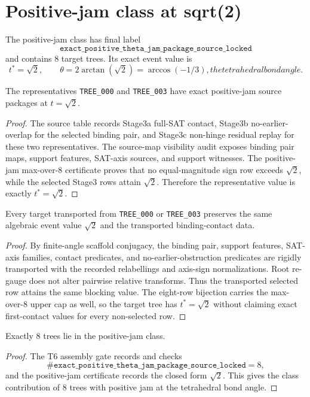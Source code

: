 
\section{Positive-jam class at sqrt(2)}

The positive-jam class has final label
\[
  \texttt{exact\_positive\_theta\_jam\_package\_source\_locked}
\]
and contains 8 target trees.  Its exact event value is
\[
  t^* = \sqrt{2}, \qquad \theta = 2\arctan(\sqrt{2}) = \arccos(-1/3), the tetrahedral bond angle.
\]

\begin{lemma}
The representatives \texttt{TREE\_000} and \texttt{TREE\_003} have exact positive-jam source packages at \(t=\sqrt{2}\).
\end{lemma}

\begin{proof}
The source table records Stage3a full-SAT contact, Stage3b no-earlier-overlap for the selected binding pair, and Stage3c non-hinge residual replay for these two representatives.  The source-map visibility audit exposes binding pair maps, support features, SAT-axis sources, and support witnesses.  The positive-jam max-over-8 certificate proves that no equal-magnitude sign row exceeds \(\sqrt{2}\), while the selected Stage3 rows attain \(\sqrt{2}\).  Therefore the representative value is exactly \(t^*=\sqrt{2}\).
\end{proof}

\begin{lemma}
Every target transported from \texttt{TREE\_000} or \texttt{TREE\_003} preserves the same algebraic event value \(\sqrt{2}\) and the transported binding-contact data.
\end{lemma}

\begin{proof}
By finite-angle scaffold conjugacy, the binding pair, support features, SAT-axis families, contact predicates, and no-earlier-obstruction predicates are rigidly transported with the recorded relabellings and axis-sign normalizations.  Root re-gauge does not alter pairwise relative transforms.  Thus the transported selected row attains the same blocking value.  The eight-row bijection carries the max-over-8 upper cap as well, so the target tree has \(t^*=\sqrt{2}\) without claiming exact first-contact values for every non-selected row.
\end{proof}

\begin{proposition}
Exactly 8 trees lie in the positive-jam class.
\end{proposition}

\begin{proof}
The T6 assembly gate records and checks
\[
  \#\texttt{exact\_positive\_theta\_jam\_package\_source\_locked}=8,
\]
and the positive-jam certificate records the closed form \(\sqrt{2}\).  This gives the class contribution of 8 trees with positive jam at the tetrahedral bond angle.
\end{proof}

